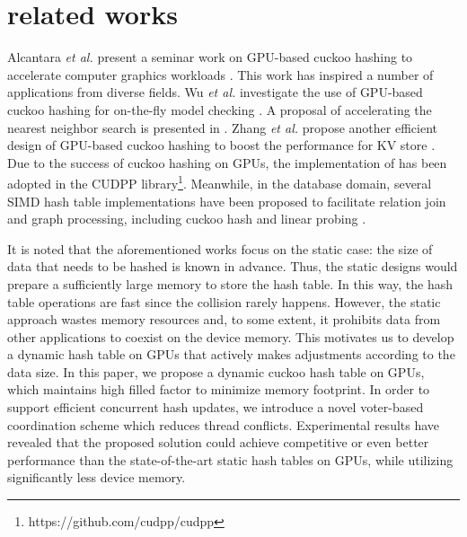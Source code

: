 \section{related works}\label{sec:rel}
Alcantara \textit{et al.} present a seminar work on GPU-based cuckoo hashing to accelerate computer graphics workloads \cite{alcantara2009real}. 
This work has inspired a number of applications from diverse fields. Wu \textit{et al.} investigate the use of GPU-based cuckoo hashing for
on-the-fly model checking \cite{wu2015gpu}. A proposal of accelerating the nearest neighbor search is presented in \cite{pan2010efficient}. 
Zhang \textit{et al.} propose another efficient design of GPU-based cuckoo hashing to boost the performance for KV store \cite{zhang2015mega}.
Due to the success of cuckoo hashing on GPUs, the implementation of \cite{alcantara2009real} has been adopted in the CUDPP library\footnote{https://github.com/cudpp/cudpp}. 
Meanwhile, in the database domain, several SIMD hash table implementations have been proposed to facilitate relation join and graph processing, including cuckoo hash \cite{ross2007efficient} and linear probing \cite{zhong2014medusa}. 

It is noted that the aforementioned works focus on the static case: the size of data that needs to be hashed is known in advance. Thus, the static designs would prepare a sufficiently large memory to store the hash table. In this way, the hash table operations are fast since the collision rarely happens. However, the static approach wastes memory resources and, to some extent, it prohibits data from other applications to coexist on the device memory. 
This motivates us to develop a dynamic hash table on GPUs that actively makes adjustments according to the data size. 
In this paper, we propose a dynamic cuckoo hash table on GPUs, which maintains high filled factor to minimize memory footprint. In order to support efficient concurrent hash updates, we introduce a novel voter-based coordination scheme which reduces thread conflicts. Experimental results have revealed that the proposed solution could achieve competitive or even better performance than the state-of-the-art static hash tables on GPUs, while utilizing significantly less device memory. 

